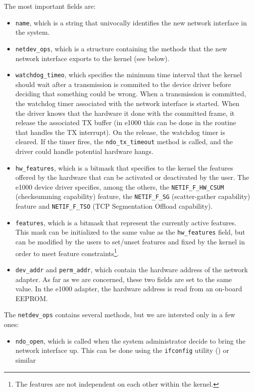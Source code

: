 The most important fields are:
\begin{itemize}
    \item \texttt{name}, which is a string that univocally identifies the new network interface in the system.
    
    \item \texttt{netdev\_ops}, which is a structure containing the methods that the new network interface exports to the kernel 
	  (see below).
	  
    \item \texttt{watchdog\_timeo}, which specifies the minimum time interval that the kernel should wait after a transmission is commited
	  to the device driver before deciding that something could be wrong. When a transmission is committed, the watchdog timer 
	  associated with the network interface is started. When the driver knows that the hardware it done with the committed frame,
	  it release the associated TX buffer (in e1000 this can be done in the routine that handles the TX interrupt). On the release,
	  the watchdog timer is cleared. If the timer fires, the \texttt{ndo\_tx\_timeout} method is called, and the driver could
	  handle potential hardware hangs.
	  
    \item \texttt{hw\_features}, which is a bitmask that specifies to the kernel the features offered by the hardware that can be activated
	  or deactivated by the user. The e1000 device driver specifies, among the others, the \texttt{NETIF\_F\_HW\_CSUM} (checksumming
	  capability) feature, the \texttt{NETIF\_F\_SG} (scatter-gather capability) feature and \texttt{NETIF\_F\_TSO} (TCP Segmentation
	  Offload capability).
	  
    \item \texttt{features}, which is a bitmask that represent the currently active features. This mask can be initialized to the same
	  value as the \texttt{hw\_features} field, but can be modified by the users to set/unset features and fixed by the kernel in
	  order to meet feature constraints\footnote{The features are not independent on each other within the kernel.}.
	  
    \item \texttt{dev\_addr} and \texttt{perm\_addr}, which contain the hardware address of the network adapter. As far as we are
	  concerned, these two fields are set to the same value. In the e1000 adapter, the hardware address is read from an on-board
	  EEPROM.
\end{itemize}


The \texttt{netdev\_ops} contains several methods, but we are intersted only in a few ones:
\begin{itemize}
    \item \texttt{ndo\_open}, which is called when the system administrator decide to bring the network interface up. This can be done
	  using the \texttt{ifconfig} utility () or similar 
\end{itemize}

